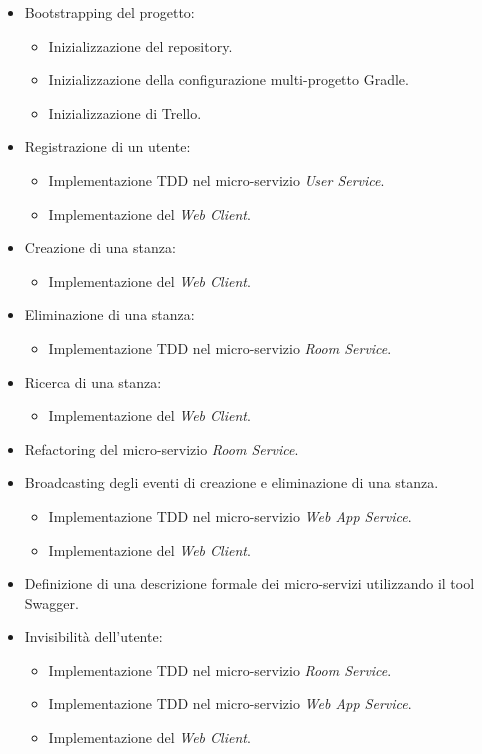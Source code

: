 \begin{itemize}
%
    \item Bootstrapping del progetto:
%
    \begin{itemize}
%
        \item Inizializzazione del repository.
%
        \item Inizializzazione della configurazione multi-progetto Gradle.
%
        \item Inizializzazione di Trello.
%
    \end{itemize}
%
    \item Registrazione di un utente:
%
    \begin{itemize}
%
        \item Implementazione TDD nel micro-servizio \textit{User Service}.
%
        \item Implementazione del \textit{Web Client}.
%
    \end{itemize}
%
    \item Creazione di una stanza:
%
    \begin{itemize}
%
        \item Implementazione del \textit{Web Client}.
%
    \end{itemize}
%
    \item Eliminazione di una stanza:
%
    \begin{itemize}
%
        \item Implementazione TDD nel micro-servizio \textit{Room Service}.
%
    \end{itemize}
%
    \item Ricerca di una stanza:
%
    \begin{itemize}
%
        \item Implementazione del \textit{Web Client}.
%
    \end{itemize}
%
    \item Refactoring del micro-servizio \textit{Room Service}.
%
    \item Broadcasting degli eventi di creazione e eliminazione di una stanza.
%
    \begin{itemize}
%
        \item Implementazione TDD nel micro-servizio \textit{Web App Service}.
%
        \item Implementazione del \textit{Web Client}.
%
    \end{itemize}
%
    \item Definizione di una descrizione formale dei micro-servizi utilizzando il tool Swagger.
%
    \item Invisibilità dell'utente:
%
    \begin{itemize}
%
        \item Implementazione TDD nel micro-servizio \textit{Room Service}.
%
        \item Implementazione TDD nel micro-servizio \textit{Web App Service}.
%
        \item Implementazione del \textit{Web Client}.
%
    \end{itemize}
%
\end{itemize}
